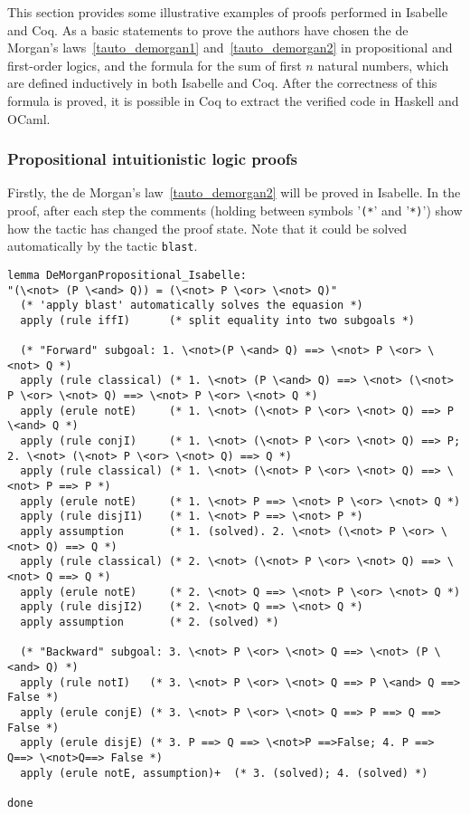 \documentclass[article]{aaltoseries}
\begin{document}
This section provides some illustrative examples of proofs performed in Isabelle and Coq. As a basic statements to prove the authors have chosen the de Morgan's laws~\ref{tauto_demorgan1} and~\ref{tauto_demorgan2} in propositional and first-order logics, and the formula for the sum of first $n$ natural numbers, which are defined inductively in both Isabelle and Coq. After the correctness of this formula is proved, it is possible in Coq to extract the verified code in Haskell and OCaml.


\subsubsection{Propositional intuitionistic logic proofs}

Firstly, the de Morgan's law~\eqref{tauto_demorgan2} will be proved in Isabelle. In the proof, after each step the comments (holding between symbols '\texttt{(*}' and '\texttt{*)}') show how the tactic has changed the proof state.
 Note that it could be solved automatically by the tactic \texttt{blast}.
\begin{lstlisting}[language=isabelle, caption={Proof of the de Morgan's law for propositions in Isabelle}, label={ex_morgan_propos_isabelle}]
lemma DeMorganPropositional_Isabelle:
"(\<not> (P \<and> Q)) = (\<not> P \<or> \<not> Q)"
  (* 'apply blast' automatically solves the equasion *)
  apply (rule iffI)      (* split equality into two subgoals *)

  (* "Forward" subgoal: 1. \<not>(P \<and> Q) ==> \<not> P \<or> \<not> Q *)
  apply (rule classical) (* 1. \<not> (P \<and> Q) ==> \<not> (\<not> P \<or> \<not> Q) ==> \<not> P \<or> \<not> Q *)
  apply (erule notE)     (* 1. \<not> (\<not> P \<or> \<not> Q) ==> P \<and> Q *)
  apply (rule conjI)     (* 1. \<not> (\<not> P \<or> \<not> Q) ==> P; 2. \<not> (\<not> P \<or> \<not> Q) ==> Q *)
  apply (rule classical) (* 1. \<not> (\<not> P \<or> \<not> Q) ==> \<not> P ==> P *)
  apply (erule notE)     (* 1. \<not> P ==> \<not> P \<or> \<not> Q *)
  apply (rule disjI1)    (* 1. \<not> P ==> \<not> P *)
  apply assumption       (* 1. (solved). 2. \<not> (\<not> P \<or> \<not> Q) ==> Q *)
  apply (rule classical) (* 2. \<not> (\<not> P \<or> \<not> Q) ==> \<not> Q ==> Q *)
  apply (erule notE)     (* 2. \<not> Q ==> \<not> P \<or> \<not> Q *)
  apply (rule disjI2)    (* 2. \<not> Q ==> \<not> Q *)
  apply assumption       (* 2. (solved) *)

  (* "Backward" subgoal: 3. \<not> P \<or> \<not> Q ==> \<not> (P \<and> Q) *)
  apply (rule notI)   (* 3. \<not> P \<or> \<not> Q ==> P \<and> Q ==> False *)   
  apply (erule conjE) (* 3. \<not> P \<or> \<not> Q ==> P ==> Q ==> False *)
  apply (erule disjE) (* 3. P ==> Q ==> \<not>P ==>False; 4. P ==> Q==> \<not>Q==> False *)
  apply (erule notE, assumption)+  (* 3. (solved); 4. (solved) *)

done
\end{lstlisting}
\end{document}
